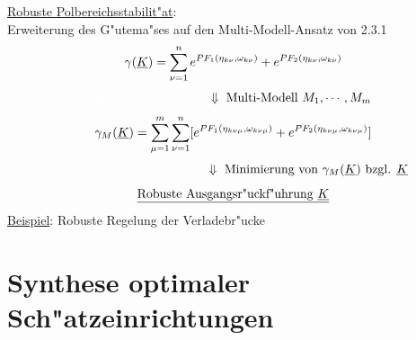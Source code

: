 \documentclass[openany,a4paper,11pt]{book}
\begin{document}
\uline{Robuste Polbereichsstabilit"at}: \\
\quad Erweiterung des G"utema"ses auf den Multi-Modell-Ansatz von 2.3.1
\[\gamma(\uline{K})=\sum_{\nu=1}^n e^{PF_1(\eta_{k\nu},\omega_{k\nu})}+e^{PF_2(\eta_{k\nu},\omega_{k\nu})}\]
\[{\color{white}yonglaizhanzishude}\Downarrow \text{ Multi-Modell } M_1,\cdots,M_m\]
\[\gamma_M(\uline{K})=\sum_{\mu=1}^m\sum_{\nu=1}^n[ e^{PF_1(\eta_{k\nu\mu},\omega_{k\nu\mu})}+e^{PF_2(\eta_{k\nu\mu},\omega_{k\nu\mu})}]\]
\[{\color{white}jiushiyonglaizhanzishude} \Downarrow \text{ Minimierung von } \gamma_M(\uline{K}) \text{ bzgl. } \uline{K}\]
\[\uline{\text{Robuste Ausgangsr"uckf"uhrung } \uline{K}}\]
\uline{Beispiel}: Robuste Regelung der Verladebr"ucke 

\chapter{Synthese optimaler Sch"atzeinrichtungen}
\end{document}
